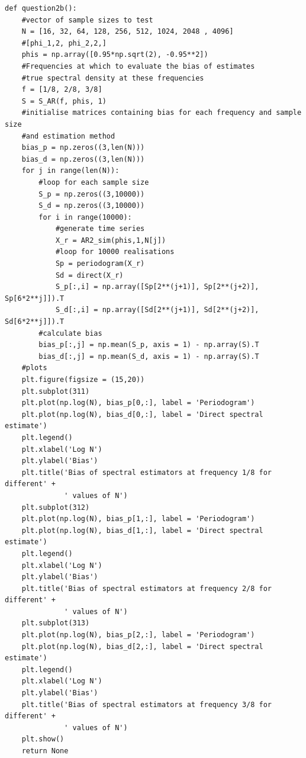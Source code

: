 \documentclass[a4paper,10pt]{article}
\theoremstyle{mytheor}
\begin{document}
\begin{lstlisting}
def question2b():
    #vector of sample sizes to test
    N = [16, 32, 64, 128, 256, 512, 1024, 2048 , 4096]
    #[phi_1,2, phi_2,2,]
    phis = np.array([0.95*np.sqrt(2), -0.95**2])
    #Frequencies at which to evaluate the bias of estimates
    #true spectral density at these frequencies
    f = [1/8, 2/8, 3/8]
    S = S_AR(f, phis, 1)
    #initialise matrices containing bias for each frequency and sample size
    #and estimation method
    bias_p = np.zeros((3,len(N)))
    bias_d = np.zeros((3,len(N)))
    for j in range(len(N)):
        #loop for each sample size
        S_p = np.zeros((3,10000))
        S_d = np.zeros((3,10000))
        for i in range(10000):
            #generate time series
            X_r = AR2_sim(phis,1,N[j])          
            #loop for 10000 realisations
            Sp = periodogram(X_r)
            Sd = direct(X_r)
            S_p[:,i] = np.array([Sp[2**(j+1)], Sp[2**(j+2)], Sp[6*2**j]]).T
            S_d[:,i] = np.array([Sd[2**(j+1)], Sd[2**(j+2)], Sd[6*2**j]]).T
        #calculate bias
        bias_p[:,j] = np.mean(S_p, axis = 1) - np.array(S).T
        bias_d[:,j] = np.mean(S_d, axis = 1) - np.array(S).T
    #plots
    plt.figure(figsize = (15,20))
    plt.subplot(311)
    plt.plot(np.log(N), bias_p[0,:], label = 'Periodogram')
    plt.plot(np.log(N), bias_d[0,:], label = 'Direct spectral estimate')
    plt.legend()
    plt.xlabel('Log N')
    plt.ylabel('Bias')
    plt.title('Bias of spectral estimators at frequency 1/8 for different' +
              ' values of N')
    plt.subplot(312)
    plt.plot(np.log(N), bias_p[1,:], label = 'Periodogram')
    plt.plot(np.log(N), bias_d[1,:], label = 'Direct spectral estimate')
    plt.legend()
    plt.xlabel('Log N')
    plt.ylabel('Bias')
    plt.title('Bias of spectral estimators at frequency 2/8 for different' +
              ' values of N')
    plt.subplot(313)
    plt.plot(np.log(N), bias_p[2,:], label = 'Periodogram')
    plt.plot(np.log(N), bias_d[2,:], label = 'Direct spectral estimate')
    plt.legend()
    plt.xlabel('Log N')
    plt.ylabel('Bias')
    plt.title('Bias of spectral estimators at frequency 3/8 for different' +
              ' values of N')
    plt.show()
    return None
\end{lstlisting}
\end{document}
